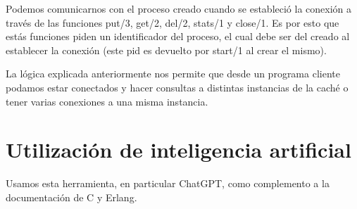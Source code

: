 \documentclass{article}
\begin{document}
Podemos comunicarnos con el proceso creado cuando
se estableció la conexión a través de las funciones
put/3, get/2, del/2, stats/1 y close/1. Es por esto
que estás funciones piden un identificador del proceso,
el cual debe ser del creado al establecer la conexión
(este pid es devuelto por start/1 al crear el mismo).

La lógica explicada anteriormente nos permite que desde
un programa cliente podamos estar conectados y hacer
consultas a distintas instancias de la caché o tener
varias conexiones a una misma instancia.

\section*{Utilización de inteligencia artificial}
Usamos esta herramienta, en particular ChatGPT,
como complemento a la documentación de C y Erlang.



\cite{herlihy2020art}
\cite{michael2010linux}
\cite{virding1996concurrent}
\end{document}
